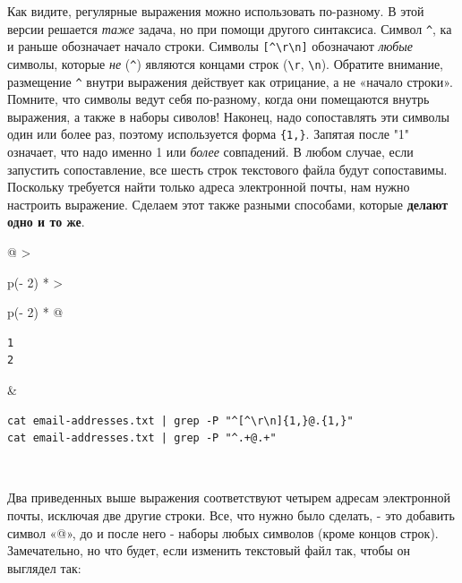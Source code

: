 \documentclass{article}
\begin{document}
Как видите, регулярные выражения можно использовать по-разному. В этой
версии решается \emph{таже} задача, но при помощи другого синтаксиса.
Символ \texttt{\^{}}, ка и раньше обозначает начало строки. Символы
\texttt{{[}\^{}\textbackslash{}r\textbackslash{}n{]}} обозначают
\emph{любые} символы, которые \emph{не} (\texttt{\^{}}) являются концами
строк (\texttt{\textbackslash{}r}, \texttt{\textbackslash{}n}). Обратите
внимание, размещение \texttt{\^{}} внутри выражения действует как
отрицание, а не «начало строки». Помните, что символы ведут себя
по-разному, когда они помещаются внутрь выражения, а также в наборы
сиволов! Наконец, надо сопоставлять эти символы один или более раз,
поэтому используется форма \texttt{\{1,\}}. Запятая после "1" означает,
что надо именно 1 или \emph{более} совпадений. В любом случае, если
запустить сопоставление, все шесть строк текстового файла будут
сопоставимы. Поскольку требуется найти только адреса электронной почты,
нам нужно настроить выражение. Сделаем этот также разными способами,
которые \textbf{делают одно и то же}.

\begin{longtable}[]{@{}
  >{\raggedright\arraybackslash}p{(\columnwidth - 2\tabcolsep) * }
  >{\raggedright\arraybackslash}p{(\columnwidth - 2\tabcolsep) * }@{}}
\toprule
\endhead
\begin{minipage}[t]{\linewidth}\raggedright
\begin{verbatim}
1
2
\end{verbatim}
\end{minipage} & \begin{minipage}[t]{\linewidth}\raggedright
\begin{verbatim}
cat email-addresses.txt | grep -P "^[^\r\n]{1,}@.{1,}"
cat email-addresses.txt | grep -P "^.+@.+"
\end{verbatim}
\end{minipage} \\ \addlinespace
\bottomrule
\end{longtable}

Два приведенных выше выражения соответствуют четырем адресам электронной
почты, исключая две другие строки. Все, что нужно было сделать, - это
добавить символ «@», до и после него - наборы любых символов (кроме
концов строк). Замечательно, но что будет, если изменить текстовый файл
так, чтобы он выглядел так:
\end{document}
